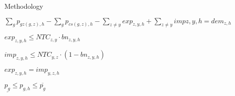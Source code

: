 \documentclass[aspectratio=169]{beamer}
\begin{document}
\begin{frame}{Methodology}
\begin{minipage}[t]{0.78\textwidth}
        \begin{coloredblock}[blue][][][1.5cm]
            \begin{center}
                \small$\sum_{g} p_{gz(g,z),h} - \sum_{g} p_{cs(g,z),h} - \sum_{z \neq y} exp_{z,y,h} + \sum_{z \neq y} imp{z,y,h} = dem_{z,h}$
            \end{center}
        \end{coloredblock}

        \begin{coloredblock}[blue][][][1.5cm]
            \begin{center}
                \small$exp_{z,y,h} \leq NTC_{z,y} \cdot bn_{z,y,h}$
            \end{center}
        \end{coloredblock}

        \begin{coloredblock}[blue][][][1.5cm]
            \begin{center}
                \small$imp_{z,y,h} \leq NTC_{y,z} \cdot (1-bn_{z,y,h})$
            \end{center}
        \end{coloredblock}

        \begin{coloredblock}[blue][][][1.5cm]
            \begin{center}
                \small$exp_{z,y,h} = imp_{y,z,h}$
            \end{center}
        \end{coloredblock}

        \begin{coloredblock}[blue][][][1.5cm]
            \begin{center}
                \small$\underline{p_g} \leq p_{g,h} \leq \overline{p_g}$
            \end{center}
        \end{coloredblock}
    \end{minipage}
    
\end{frame}
\end{document}
